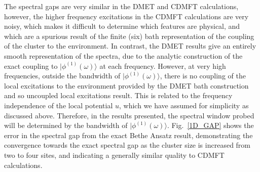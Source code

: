 \documentclass[aps,twocolumn,nobibnotes]{revtex4}
\begin{document}
The spectral gaps are very similar in the DMET and CDMFT calculations, however, the higher frequency excitations in the CDMFT calculations are very noisy, which makes it difficult to determine 
which features are physical, and which are a spurious result of the finite (six) bath representation of the coupling of the cluster to the environment. In contrast, the DMET results give an entirely smooth
representation of the spectra, due to the analytic construction of the exact coupling to $|\phi^{(1)}(\omega)\rangle$ at each frequency. However, 
at very high frequencies, outside the bandwidth of $|\phi^{(1)}(\omega)\rangle$, there is no coupling of the local excitations to the 
environment provided by the DMET bath construction and so uncoupled local excitations result. This is related to the frequency 
independence of the local potential $u$, which we have assumed for simplicity as discussed above. 
Therefore, in the results presented, the spectral window probed will be determined by the bandwidth of $|\phi^{(1)}(\omega)\rangle$. 
Fig.~\ref{1D_GAP} shows the error in the spectral gap from the exact Bethe Ansatz result\cite{Ovchinni1970}, demonstrating 
the convergence towards the exact spectral gap as the cluster size is increased 
from two to four sites, and indicating a generally similar quality to CDMFT calculations.
\end{document}
